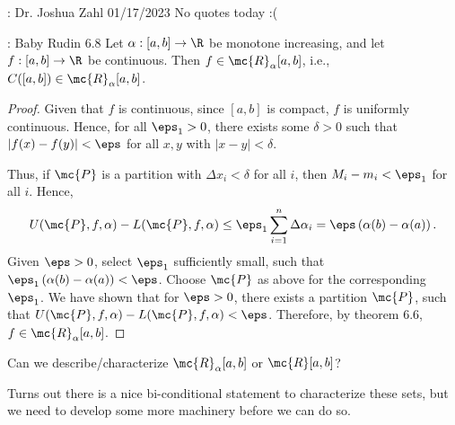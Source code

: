 \begin{nquote}{: Dr. Joshua Zahl 01/17/2023}
	No quotes today :(
\end{nquote}

\begin{ntheorem}{: Baby Rudin 6.8}
	Let \(\alpha:[a,b]\to\R\) be monotone increasing, and let \(f:[a,b]\to\R\) be continuous. Then \(f\in\mc{R}_{\alpha}[a,b]\), i.e., \(C([a,b])\in\mc{R}_{\alpha}[a,b]\).
\end{ntheorem}
\begin{proof}
	Given that \(f\) is continuous, since \([a,b]\) is compact, \(f\) is uniformly continuous. Hence, for all \(\eps_1>0\), there exists some \(\delta>0\) such that \(|f(x)-f(y)|<\eps\) for all \(x,y\) with \(|x-y|<\delta\). 
	
	\smallskip
	
	Thus, if \(\mc{P}\) is a partition with \(\Delta x_i<\delta\) for all \(i\), then \(M_i-m_i<\eps_1\) for all \(i\). Hence, 
	\begin{equation*}
		U(\mc{P},f,\alpha)-L(\mc{P},f,\alpha)\leq \eps_1\sum_{i=1}^{n}\Delta\alpha_i=\eps\left(\alpha(b)-\alpha(a)\right).
	\end{equation*} 
	Given \(\eps>0\), select \(\eps_1\) sufficiently small, such that \(\eps_1\left(\alpha(b)-\alpha(a)\right)<\eps\). Choose \(\mc{P}\) as above for the corresponding \(\eps_1\). We have shown that for \(\eps>0\), there exists a partition \(\mc{P}\), such that \(U(\mc{P},f,\alpha)-L(\mc{P},f,\alpha)<\eps\). Therefore, by theorem 6.6, \(f\in\mc{R}_{\alpha}[a,b]\).
\end{proof}

\begin{fft}
	Can we describe/characterize \(\mc{R}_{\alpha}[a,b]\) or \(\mc{R}[a,b]\)?
\end{fft}
Turns out there is a nice bi-conditional statement to characterize these sets, but we need to develop some more machinery before we can do so.

